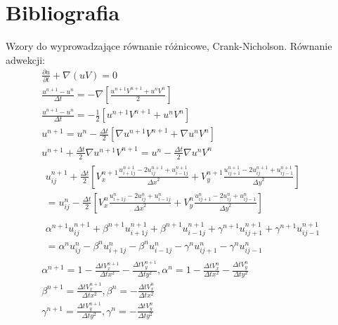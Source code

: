 \documentclass[a4paper,12pt]{book}
\begin{document}
\chapter{Bibliografia}
Wzory do wyprowadzające równanie różnicowe, Crank-Nicholson.
Równanie adwekcji:
\begin{gather}
\frac{\partial u}{\partial t} + \nabla(uV) = 0 \\ 
\frac{u^{n+1} - u^n}{\Delta t} = - \nabla\left[\frac{u^{n+1}V^{n+1} + u^n V^n}{2}\right] \\
\frac{u^{n+1} - u^n}{\Delta t} = - \frac{1}{2}\left[{u^{n+1}V^{n+1} + u^n V^n}\right] \\
u^{n+1} = u^n - \frac{\Delta t}{2}\left[{\nabla u^{n+1}V^{n+1} + \nabla u^nV^n}\right] \\
u^{n+1} + \frac{\Delta t}{2}{\nabla u^{n+1}V^{n+1}}=u^n - \frac{\Delta t}{2}{\nabla u^n V^n}\\
\begin{split}
u_{ij}^{n+1} + \frac{\Delta t}{2}\left[V_x^{n+1} \frac{u_{i+1j}^{n+1} - 2u_{ij}^{n+1} + u_{i-1j}^{n+1}}{{\Delta x}^2}
	+ V_y^{n+1} \frac{u_{ij+1}^{n+1} - 2u_{ij}^{n+1} + u_{ij-1}^{n+1}}{{\Delta y}^2}\right] \\
= u_{ij}^{n} - \frac{\Delta t}{2}\left[V_x^{n} \frac{u_{i+1j}^{n} - 2u_{ij}^{n} + u_{i-1j}^{n}}{{\Delta x}^2}
	+ V_y^{n} \frac{u_{ij+1}^{n} - 2u_{ij}^{n} + u_{ij-1}^{n}}{{\Delta y}^2}\right] 
\end{split} \\ 
\begin{split}
\alpha^{n+1} u_{ij}^{n+1} + \beta^{n+1} u_{i+1j}^{n+1} + \beta^{n+1} u_{i-1j}^{n+1}
	+ \gamma^{n+1} u_{ij+1}^{n+1} + \gamma^{n+1} u_{ij-1}^{n+1}\\
= \alpha^{n} u_{ij}^{n} - \beta^{n} u_{i+1j}^{n} - \beta^{n} u_{i-1j}^{n}
	- \gamma^{n} u_{ij+1}^{n} - \gamma^{n} u_{ij-1}^{n} 
\end{split}\\
\alpha^{n+1} = 1 - \frac{\Delta t V_{x}^{n+1}}{\Delta t x^2} - \frac{\Delta t V_{y}^{n+1}}{\Delta t y^2},
\alpha^{n} = 1 - \frac{\Delta t V_{x}^{n}}{\Delta t x^2} - \frac{\Delta t V_{y}^{n}}{\Delta t y^2}\\
\beta^{n+1} = \frac{\Delta t V_{x}^{n+1}}{\Delta t x^2},
\beta^{n} = - \frac{\Delta t V_{x}^{n}}{\Delta t x^2}\\
\gamma^{n+1} = \frac{\Delta t V_{y}^{n+1}}{\Delta t y^2},
\gamma^{n} = - \frac{\Delta t V_{y}^{n}}{\Delta t y^2}\\
\end{gather}
\end{document}
